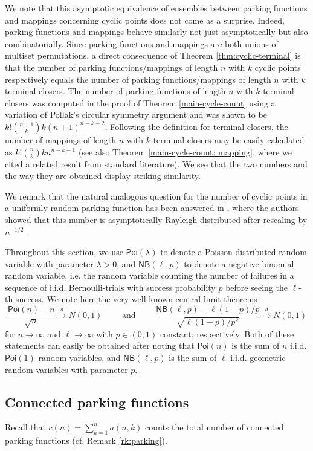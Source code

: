 \documentclass[letterpaper]{amsart}
\theoremstyle{plain}
\theoremstyle{definition}
\theoremstyle{remark}
\newcommand{\dto}{\stackrel{d}{\longrightarrow}}
\newcommand{\Poi}{\mathsf{Poi}}
\newcommand{\NB}{\mathsf{NB}}
\begin{document}
We note that this asymptotic equivalence of ensembles between parking functions and mappings concerning cyclic points does not come as a surprise. Indeed, parking functions and mappings behave similarly not just asymptotically but also combinatorially. Since parking functions and mappings are both unions of multiset permutations, a direct consequence of Theorem \ref{thm:cyclic-terminal} is that the number of parking functions/mappings of length $n$ with $k$ cyclic points respectively equals the number of parking functions/mappings of length $n$ with $k$ terminal closers. The number of parking functions of length $n$ with $k$ terminal closers was computed in the proof of Theorem \ref{main-cycle-count} using a variation of Pollak's circular symmetry argument and was shown to be $k! \binom{n+1}{k} k (n+1)^{n - k - 2}$. Following the definition for terminal closers, the number of mappings of length $n$ with $k$ terminal closers may be easily calculated as $k! \binom{n}{k} k n^{n-k-1}$ (see also Theorem \ref{main-cycle-count: mapping}, where we cited a related result from standard literature). We see that the two numbers and the way they are obtained display striking similarity.

We remark that the natural analogous question for the number of cyclic points in a uniformly random parking function has been answered in \cite{Paguyo2025}, where the authors showed that this number is asymptotically Rayleigh-distributed after rescaling by $n^{-1/2}$.

Throughout this section, we use $\Poi(\lambda)$ to denote a Poisson-distributed random variable with parameter $\lambda>0$, and $\NB(\ell,p)$ to denote a negative binomial random variable, i.e. the random variable counting the number of failures in a sequence of i.i.d. Bernoulli-trials with success probability $p$ before seeing the $\ell$-th success. We note here the very well-known central limit theorems
\[
 \frac{\Poi(n)-n}{\sqrt{n}} \dto N(0,1) \qquad \text{ and } \qquad \frac{\NB(\ell,p)-\ell(1-p)/p}{\sqrt{\ell(1-p)/p^2}} \dto N(0,1)
\]
for $n\to\infty$ and $\ell\to\infty$ with $p\in(0,1)$ constant, respectively. 
Both of these statements can easily be obtained after noting that $\Poi(n)$ is the sum of $n$ i.i.d. $\Poi(1)$ random variables, and $\NB(\ell,p)$ is the sum of $\ell$ i.i.d. geometric random variables with parameter $p$.


\subsection{Connected parking functions}\label{subsec:cpf}
Recall that $c(n)=\sum_{k=1}^n a(n,k)$ counts the total number of connected parking functions (cf. Remark \ref{rk:parking}). 
\end{document}
